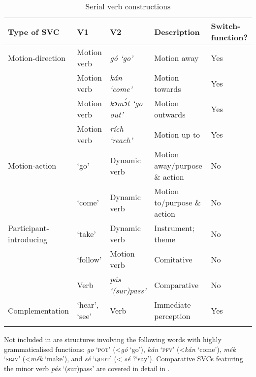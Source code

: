 \begin{table}
\caption{Serial verb constructions}
\label{tab:key:11.1}
\small
\begin{tabularx}{\textwidth}{lp{1.8cm}lQQ}
\lsptoprule

Type of SVC & V1 & V2 & Description & Switch-function?\\
\midrule
Motion-direction & Motion verb & \itshape gó \textup{‘go’} & Motion away & Yes\\
& Motion verb & \itshape kán \textup{‘come’} & Motion towards & Yes\\
& Motion verb & \itshape kɔmɔ́t \textup{‘go out’} & Motion outwards & Yes\\
& Motion verb & \itshape rích \textup{‘reach’} & Motion up to & Yes\\

\tablevspace
Motion-action &  ‘go’ & Dynamic verb & Motion away/purpose \& action & No\\
&  ‘come’ & Dynamic verb & Motion to/purpose \& action & No\\

\tablevspace
Participant-introducing  &  ‘take’ & Dynamic verb & Instrument; theme\index{} & No\\
&  ‘follow’ & Motion verb & Comitative  & No\\
& Verb & \itshape pás \textup{‘(sur)pass’} & Comparative & No\\


\tablevspace
Complementation &  ‘hear’,\newline  {} ‘see’ & Verb & Immediate perception & Yes\\
\lspbottomrule
\end{tabularx}
\end{table}


Not included in  are structures involving the following words with highly grammaticalised functions: \textit{go} \textsc{‘pot’} (<\textit{gó} ‘go’), \textit{kán} \textsc{‘pfv’} (<\textit{kán} ‘come’), \textit{mék} \textsc{‘sbjv’} (<\textit{mék} ‘make’), and \textit{sé} \textsc{‘quot’} (< \textit{sé} ?‘say’). Comparative SVCs featuring the minor verb \textit{pás} ‘(sur)pass’ are covered in detail in .


